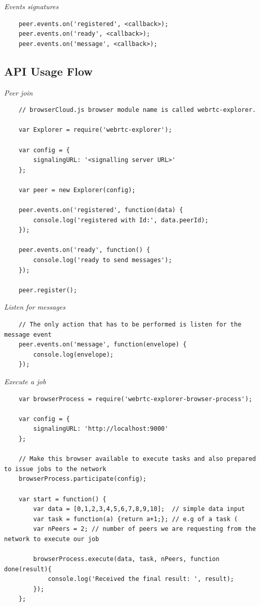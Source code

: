 \textit{Events signatures}
\begingroup
\scriptsize
\begin{verbatim}
    peer.events.on('registered', <callback>);
    peer.events.on('ready', <callback>);
    peer.events.on('message', <callback>);

\end{verbatim}
\endgroup

\subsection{API Usage Flow}

\textit{Peer join}
\begingroup
\scriptsize
\begin{verbatim}
    // browserCloud.js browser module name is called webrtc-explorer.

    var Explorer = require('webrtc-explorer');

    var config = {
        signalingURL: '<signalling server URL>'
    };

    var peer = new Explorer(config);

    peer.events.on('registered', function(data) {
        console.log('registered with Id:', data.peerId);
    });

    peer.events.on('ready', function() {
        console.log('ready to send messages');
    });

    peer.register();
\end{verbatim}
\endgroup

\textit{Listen for messages}
\begingroup
\scriptsize
\begin{verbatim}
    // The only action that has to be performed is listen for the message event
    peer.events.on('message', function(envelope) {
        console.log(envelope);
    });
\end{verbatim}
\endgroup

\textit{Execute a job}
\begingroup
\scriptsize
\begin{verbatim}
    var browserProcess = require('webrtc-explorer-browser-process');

    var config = {
        signalingURL: 'http://localhost:9000'
    };

    // Make this browser available to execute tasks and also prepared to issue jobs to the network
    browserProcess.participate(config);

    var start = function() {
        var data = [0,1,2,3,4,5,6,7,8,9,10];  // simple data input
        var task = function(a) {return a+1;}; // e.g of a task (
        var nPeers = 2; // number of peers we are requesting from the network to execute our job

        browserProcess.execute(data, task, nPeers, function done(result){
            console.log('Received the final result: ', result);
        });
    };
\end{verbatim}
\endgroup

